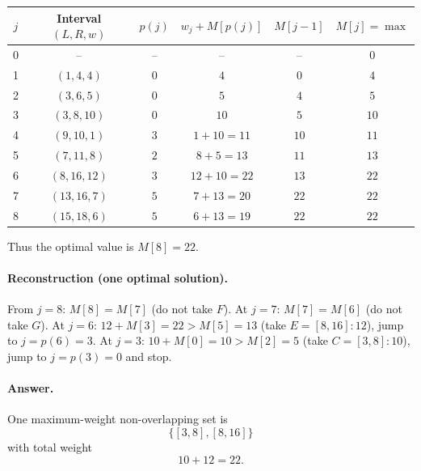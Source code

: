 \medskip
\begin{tabular}{@{}cccccc@{}}
    \toprule
    $j$ & Interval $(L,R,w)$ & $p(j)$ & $w_j+M[p(j)]$ & $M[j-1]$ & $M[j]=\max$ \\
    \midrule
    0   & --                 & --     & --            & --       & $0$         \\
    1   & $(1,4,4)$          & $0$    & $4$           & $0$      & $4$         \\
    2   & $(3,6,5)$          & $0$    & $5$           & $4$      & $5$         \\
    3   & $(3,8,10)$         & $0$    & $10$          & $5$      & $10$        \\
    4   & $(9,10,1)$         & $3$    & $1+10=11$     & $10$     & $11$        \\
    5   & $(7,11,8)$         & $2$    & $8+5=13$      & $11$     & $13$        \\
    6   & $(8,16,12)$        & $3$    & $12+10=22$    & $13$     & $22$        \\
    7   & $(13,16,7)$        & $5$    & $7+13=20$     & $22$     & $22$        \\
    8   & $(15,18,6)$        & $5$    & $6+13=19$     & $22$     & $22$        \\
    \bottomrule
\end{tabular}

\medskip
Thus the optimal value is $M[8]=\boxed{22}$.

\paragraph{Reconstruction (one optimal solution).}
From $j=8$: $M[8]=M[7]$ (do not take $F$).
At $j=7$: $M[7]=M[6]$ (do not take $G$).
At $j=6$: $12+M[3]=22>M[5]=13$ (take $E=[8,16]:12$), jump to $j=p(6)=3$.
At $j=3$: $10+M[0]=10>M[2]=5$ (take $C=[3,8]:10$), jump to $j=p(3)=0$ and stop.

\paragraph{Answer.}
One maximum-weight non-overlapping set is
\[
    \boxed{\{[3,8],[8,16]\}}
\]
with total weight
\[
    \boxed{10+12=22}.
\]
